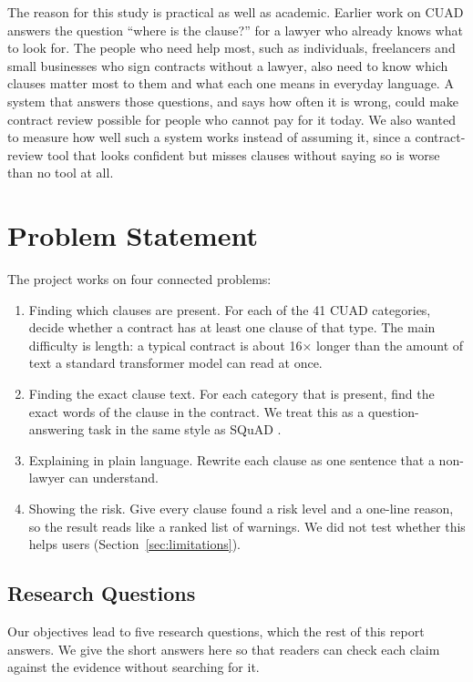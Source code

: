 The reason for this study is practical as well as academic. Earlier work on CUAD answers the question ``where is the clause?'' for a lawyer who already knows what to look for. The people who need help most, such as individuals, freelancers and small businesses who sign contracts without a lawyer, also need to know which clauses matter most to them and what each one means in everyday language. A system that answers those questions, and says how often it is wrong, could make contract review possible for people who cannot pay for it today. We also wanted to measure how well such a system works instead of assuming it, since a contract-review tool that looks confident but misses clauses without saying so is worse than no tool at all.

\section{Problem Statement}
The project works on four connected problems:
\begin{enumerate}[itemsep=2pt]
  \item Finding which clauses are present. For each of the 41 CUAD categories, decide whether a contract has at least one clause of that type. The main difficulty is length: a typical contract is about 16$\times$ longer than the amount of text a standard transformer model can read at once.
  \item Finding the exact clause text. For each category that is present, find the exact words of the clause in the contract. We treat this as a question-answering task in the same style as SQuAD \cite{rajpurkar2016squad}.
  \item Explaining in plain language. Rewrite each clause as one sentence that a non-lawyer can understand.
  \item Showing the risk. Give every clause found a risk level and a one-line reason, so the result reads like a ranked list of warnings. We did not test whether this helps users (Section~\ref{sec:limitations}).
\end{enumerate}

\subsection{Research Questions}
\label{sec:rqs}
Our objectives lead to five research questions, which the rest of this report answers. We give the short answers here so that readers can check each claim against the evidence without searching for it.

